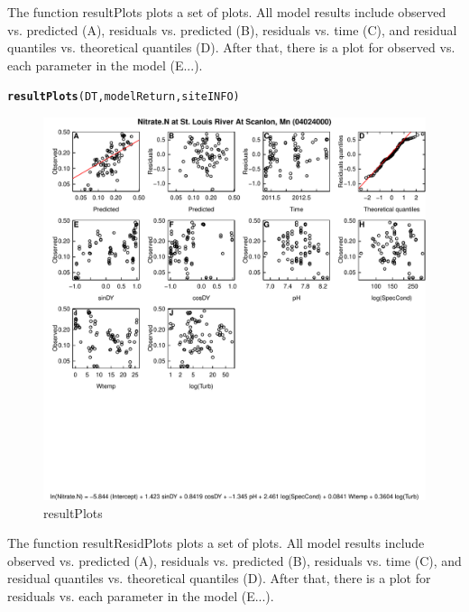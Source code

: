 \documentclass[a4paper,11pt]{article}\usepackage[]{graphicx}\usepackage[]{color}
\makeatletter
\def\maxwidth{ %
  \ifdim\Gin@nat@width>\linewidth
    \linewidth
  \else
    \Gin@nat@width
  \fi
}
\newcommand{\hlstd}[1]{\textcolor[rgb]{0.345,0.345,0.345}{#1}}%
\newcommand{\hlkwd}[1]{\textcolor[rgb]{0.737,0.353,0.396}{\textbf{#1}}}%
\newenvironment{kframe}{%
 \def\at@end@of@kframe{}%
 \ifinner\ifhmode%
  \def\at@end@of@kframe{\end{minipage}}%
  \begin{minipage}{\columnwidth}%
 \fi\fi%
 \def\FrameCommand##1{\hskip\@totalleftmargin \hskip-\fboxsep
 \colorbox{shadecolor}{##1}\hskip-\fboxsep
     \hskip-\linewidth \hskip-\@totalleftmargin \hskip\columnwidth}%
 \MakeFramed {\advance\hsize-\width
   \@totalleftmargin\z@ \linewidth\hsize
   \@setminipage}}%
 {\par\unskip\endMakeFramed%
 \at@end@of@kframe}
\newenvironment{knitrout}{}{} %
\makeatother
\begin{document}
The function resultPlots plots a set of plots. All model results include observed vs. predicted (A), residuals vs. predicted (B), residuals vs. time (C), and residual quantiles vs. theoretical quantiles (D). After that, there is a plot for observed vs. each parameter in the model (E...).

\begin{knitrout}
\color{fgcolor}\begin{kframe}
\begin{alltt}
\hlkwd{resultPlots}\hlstd{(DT,modelReturn,siteINFO)}
\end{alltt}
\end{kframe}\begin{figure}[]

\includegraphics[width=\maxwidth]{figure/resultPlots} \caption[resultPlots]{resultPlots\label{fig:resultPlots}}
\end{figure}


\end{knitrout}

\FloatBarrier

The function resultResidPlots plots a set of plots. All model results include observed vs. predicted (A), residuals vs. predicted (B), residuals vs. time (C), and residual quantiles vs. theoretical quantiles (D). After that, there is a plot for residuals vs. each parameter in the model (E...).
\end{document}
